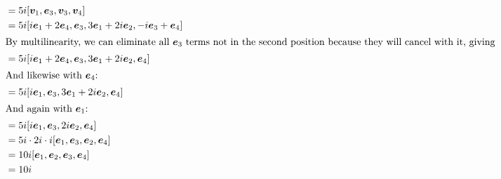 \documentclass{article}
\begin{document}
	\begin{align*}
		[\bm v_1, \bm v_2, \bm v_3, \bm v_4]
		&= 5i[\bm v_1, \bm e_3, \bm v_3, \bm v_4] \\
		&= 5i[i\bm e_1 + 2\bm e_4, \bm e_3, 3\bm e_1 + 2i\bm e_2, -i\bm e_3 + \bm e_4] \\
		\intertext{By multilinearity, we can eliminate all $\bm e_3$ terms not in the second position because they will cancel with it, giving}
		&= 5i[i\bm e_1 + 2\bm e_4, \bm e_3, 3\bm e_1 + 2i\bm e_2, \bm e_4] \\
		\intertext{And likewise with $\bm e_4$:}
		&= 5i[i\bm e_1, \bm e_3, 3\bm e_1 + 2i\bm e_2, \bm e_4] \\
		\intertext{And again with $\bm e_1$:}
		&= 5i[i\bm e_1, \bm e_3, 2i\bm e_2, \bm e_4] \\
		&= 5i\cdot 2i \cdot i[\bm e_1, \bm e_3, \bm e_2, \bm e_4] \\
		&= 10i[\bm e_1, \bm e_2, \bm e_3, \bm e_4] \\
		&= 10i
	\end{align*}
\end{document}
